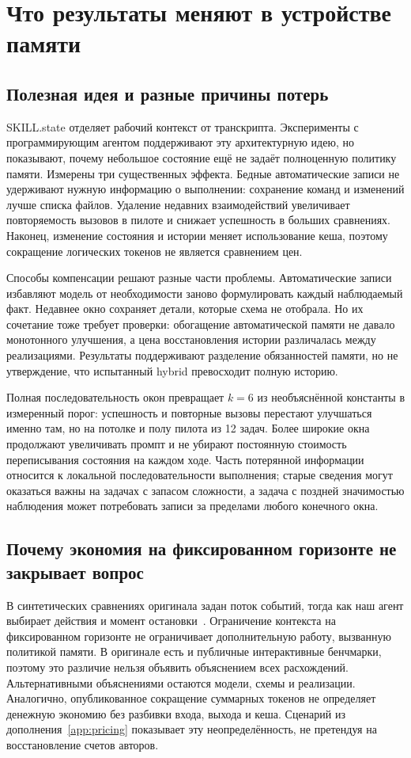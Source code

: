 \section{Что результаты меняют в устройстве памяти}
\label{sec:discussion}
\subsection{Полезная идея и разные причины потерь}
SKILL.state отделяет рабочий контекст от транскрипта. Эксперименты с программирующим агентом поддерживают эту архитектурную идею, но показывают, почему небольшое состояние ещё не задаёт полноценную политику памяти. Измерены три существенных эффекта. Бедные автоматические записи не удерживают нужную информацию о выполнении: сохранение команд и изменений лучше списка файлов. Удаление недавних взаимодействий увеличивает повторяемость вызовов в пилоте и снижает успешность в больших сравнениях. Наконец, изменение состояния и истории меняет использование кеша, поэтому сокращение логических токенов не является сравнением цен.

Способы компенсации решают разные части проблемы. Автоматические записи избавляют модель от необходимости заново формулировать каждый наблюдаемый факт. Недавнее окно сохраняет детали, которые схема не отобрала. Но их сочетание тоже требует проверки: обогащение автоматической памяти не давало монотонного улучшения, а цена восстановления истории различалась между реализациями. Результаты поддерживают разделение обязанностей памяти, но не утверждение, что испытанный hybrid превосходит полную историю.

Полная последовательность окон превращает $k=6$ из необъяснённой
константы в измеренный порог: успешность и повторные вызовы перестают
улучшаться именно там, но на потолке и полу пилота из 12 задач. Более
широкие окна продолжают увеличивать промпт и не убирают постоянную
стоимость переписывания состояния на каждом ходе. Часть потерянной
информации относится к локальной последовательности выполнения; старые
сведения могут оказаться важны на задачах с запасом сложности, а задача
с поздней значимостью наблюдения может потребовать записи за пределами
любого конечного окна.

\subsection{Почему экономия на фиксированном горизонте не закрывает вопрос}
В синтетических сравнениях оригинала задан поток событий, тогда как наш агент выбирает действия и момент остановки~\citep{skillstate2026}. Ограничение контекста на фиксированном горизонте не ограничивает дополнительную работу, вызванную политикой памяти. В оригинале есть и публичные интерактивные бенчмарки, поэтому это различие нельзя объявить объяснением всех расхождений. Альтернативными объяснениями остаются модели, схемы и реализации. Аналогично, опубликованное сокращение суммарных токенов не определяет денежную экономию без разбивки входа, выхода и кеша. Сценарий из дополнения~\ref{app:pricing} показывает эту неопределённость, не претендуя на восстановление счетов авторов.

